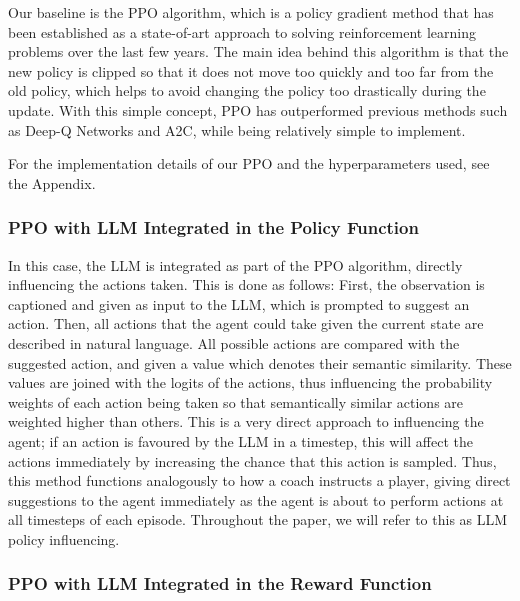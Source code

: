 \documentclass[conference]{IEEEtran}
\begin{document}
Our baseline is the PPO algorithm, which is a policy gradient method that has been established as a state-of-art approach to solving reinforcement learning problems over the last few years. The main idea behind this algorithm is that the new policy is clipped so that it does not move too quickly and too far from the old policy, which helps to avoid changing the policy too drastically during the update. With this simple concept, PPO has outperformed previous methods such as Deep-Q Networks and A2C, while being relatively simple to implement\cite{ppo}.

For the implementation details of our PPO and the hyperparameters used, see the Appendix.


\subsubsection{PPO with LLM Integrated in the Policy Function}

In this case, the LLM is integrated as part of the PPO algorithm, directly influencing the actions taken. This is done as follows: First, the observation is captioned and given as input to the LLM, which is prompted to suggest an action. Then, all actions that the agent could take given the current state are described in natural language. All possible actions are compared with the suggested action, and given a value which denotes their semantic similarity. These values are joined with the logits of the actions, thus influencing the probability weights of each action being taken so that semantically similar actions are weighted higher than others. This is a very direct approach to influencing the agent; if an action is favoured by the LLM in a timestep, this will affect the actions immediately by increasing the chance that this action is sampled. Thus, this method functions analogously to how a coach instructs a player, giving direct suggestions to the agent immediately as the agent is about to perform actions at all timesteps of each episode. Throughout the paper, we will refer to this as LLM policy influencing.

\subsubsection{PPO with LLM Integrated in the Reward Function}
\end{document}

